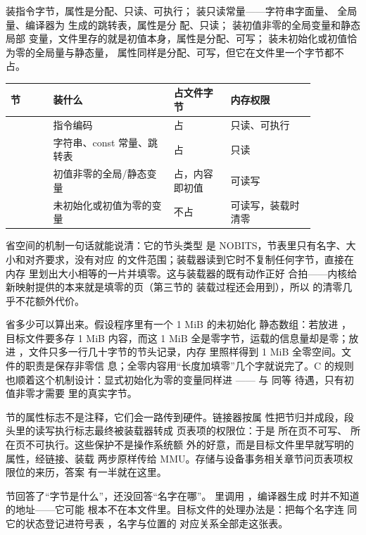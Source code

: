  装指令字节，属性是分配、只读、可执行；
 装只读常量——字符串字面量、
全局量、编译器为  生成的跳转表，属性是分
配、只读； 装初值非零的全局变量和静态局部
变量，文件里存的就是初值本身，属性是分配、可写；
 装未初始化或初值恰为零的全局量与静态量，
属性同样是分配、可写，但它在文件里一个字节都不占。

\begin{longtable}{L{0.12\linewidth}L{0.34\linewidth}L{0.16\linewidth}L{0.24\linewidth}}
\toprule
节 & 装什么 & 占文件字节 & 内存权限 \\
\midrule
{} & 指令编码 & 占 & 只读、可执行 \\\tablerowrule
{} & 字符串、const 常量、跳转表 & 占 & 只读 \\\tablerowrule
{} & 初值非零的全局/静态变量 & 占，内容即初值 & 可读写 \\\tablerowrule
{} & 未初始化或初值为零的变量 & 不占 & 可读写，装载时清零 \\
\bottomrule
\end{longtable}

 省空间的机制一句话就能说清：它的节头类型
是 NOBITS，节表里只有名字、大小和对齐要求，没有对应
的文件范围；装载器读到它时不复制任何字节，直接在内存
里划出大小相等的一片并填零。这与装载器的既有动作正好
合拍——内核给新映射提供的本来就是填零的页（第三节的
装载过程还会用到），所以
 的清零几乎不花额外代价。

省多少可以算出来。假设程序里有一个 1 MiB 的未初始化
静态数组：若放进 ，目标文件要多存 1 MiB
内容，而这 1 MiB 全是零字节，运载的信息量却是零；放
进 ，文件只多一行几十字节的节头记录，内存
里照样得到 1 MiB 全零空间。文件的职责是保存非零信
息；全零内容用“长度加填零”几个字就说完了。C 的规则
也顺着这个机制设计：显式初始化为零的变量同样进
—— 与  同等
待遇，只有初值非零才需要  里的真实字节。

节的属性标志不是注释，它们会一路传到硬件。链接器按属
性把节归并成段，段头里的读写执行标志最终被装载器转成
页表项的权限位：于是  所在页不可写、
 所在页不可执行。这些保护不是操作系统额
外的好意，而是目标文件里早就写明的属性，经链接、装载
两步原样传给 MMU。存储与设备事务相关章节问页表项权限位的来历，答案
有一半就在这里。

节回答了“字节是什么”，还没回答“名字在哪”。
 里调用 ，编译器生成
 时并不知道  的地址——它可能
根本不在本文件里。目标文件的处理办法是：把每个名字连
同它的状态登记进符号表 ，名字与位置的
对应关系全部走这张表。

